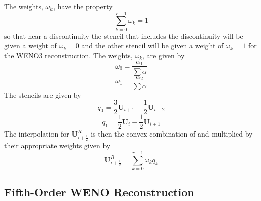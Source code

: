 The weights, $\omega_k$, have the property
\begin{equation}
	\sum_{k=0}^{r-1} \omega_k = 1
\end{equation}
so that near a discontinuity the stencil that includes the discontinuity will be given a weight of $\omega_k = 0$ and the other stencil will be given a weight of $\omega_k = 1$ for the WENO3 reconstruction. The weights, $\omega_k$, are given by
\begin{equation}
	\omega_0 = \frac{\alpha_1}{\sum \alpha}
\end{equation}
\begin{equation}
	\omega_1 = \frac{\alpha_2}{\sum \alpha}
\end{equation}
The stencils are given by
\begin{equation}\label{eqn:q13}
	q_0 = \frac{3}{2} \boldsymbol{U}_{i+1} - \frac{1}{2} \boldsymbol{U}_{i+2}
\end{equation}
\begin{equation}\label{eqn:q23}
	q_1 = \frac{1}{2} \boldsymbol{U}_{i} - \frac{1}{2} \boldsymbol{U}_{i+1}
\end{equation}
The interpolation for $\boldsymbol{U}_{i+\frac{1}{2}}^R$ is then the convex combination of  and  multiplied by their appropriate weights given by
\begin{equation}\label{eqn:WENOSum}
	\boldsymbol{U}^{R}_{i+\frac{1}{2}} = \sum_{k=0}^{r-1} \omega_k q_k
\end{equation}
\subsection{Fifth-Order WENO Reconstruction}

